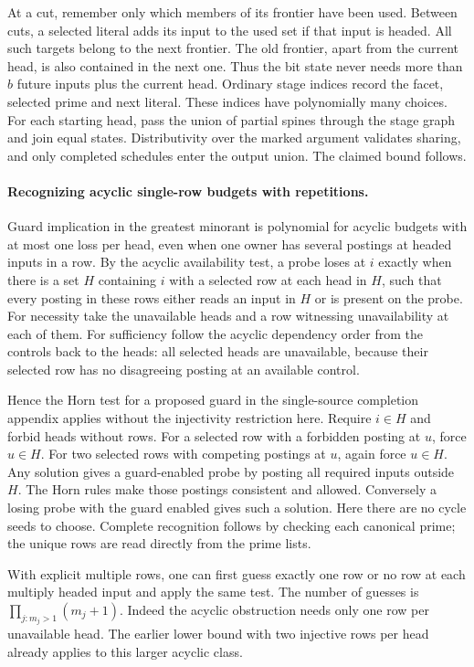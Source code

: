 At a cut, remember only which members of its frontier
have been used. Between cuts, a selected literal
adds its input to the used set if that input is
headed. All such targets belong to the next frontier.
The old frontier, apart from the current head, is
also contained in the next one. Thus the bit state
never needs more than $b$ future inputs plus the
current head. Ordinary stage indices record the
facet, selected prime and next literal. These
indices have polynomially many choices. For each
starting head, pass the union of partial spines
through the stage graph and join equal states.
Distributivity over the marked argument validates
sharing, and only completed schedules enter the
output union. The claimed bound follows.

\paragraph{Recognizing acyclic single-row budgets with repetitions.}
Guard implication in the greatest minorant is
polynomial for acyclic budgets with at most one
loss per head, even when one owner has several
postings at headed inputs in a row. By the
acyclic availability test, a probe loses at $i$
exactly when there is a set $H$ containing $i$
with a selected row at each head in $H$, such
that every posting in these rows either reads
an input in $H$ or is present on the probe.
For necessity take the unavailable heads and
a row witnessing unavailability at each of
them. For sufficiency follow the acyclic
dependency order from the controls back to
the heads: all selected heads are unavailable,
because their selected row has no disagreeing
posting at an available control.

Hence the Horn test for a proposed guard in
the single-source completion appendix applies
without the injectivity restriction here. Require
$i\in H$ and forbid heads without rows.
For a selected row with a forbidden posting
at $u$, force $u\in H$. For two selected rows
with competing postings at $u$, again force
$u\in H$. Any solution gives a guard-enabled
probe by posting all required inputs outside
$H$. The Horn rules make those postings
consistent and allowed. Conversely a losing
probe with the guard enabled gives such a
solution. Here there are no cycle seeds to
choose. Complete recognition follows by
checking each canonical prime; the unique
rows are read directly from the prime lists.

With explicit multiple rows, one can first
guess exactly one row or no row at each
multiply headed input and apply the same
test. The number of guesses is
$\prod_{j:m_j>1}(m_j+1)$. Indeed the
acyclic obstruction needs only one row per
unavailable head. The earlier lower bound
with two injective rows per head already
applies to this larger acyclic class.

